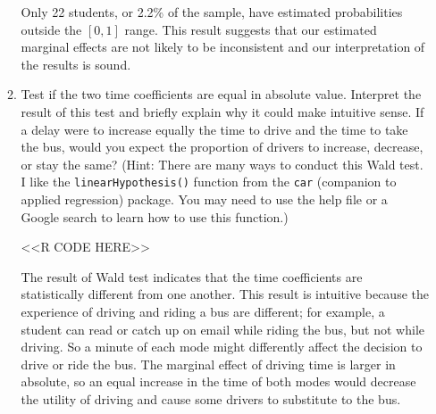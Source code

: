 \documentclass[11pt,letterpaper]{article}
\begin{document}
\begin{enumerate}[label=\alph*., leftmargin=*]
\begin{enumerate}[label=\roman*.]
		Only 22 students, or 2.2\% of the sample, have estimated probabilities outside the $[0, 1]$ range. This result suggests that our estimated marginal effects are not likely to be inconsistent and our interpretation of the results is sound.

		\item Test if the two time coefficients are equal in absolute value. Interpret the result of this test and briefly explain why it could make intuitive sense. If a delay were to increase equally the time to drive and the time to take the bus, would you expect the proportion of drivers to increase, decrease, or stay the same? (Hint: There are many ways to conduct this Wald test. I like the \texttt{linearHypothesis()} function from the \texttt{car} (companion to applied regression) package. You may need to use the help file or a Google search to learn how to use this function.) 

		<<R CODE HERE>>

		The result of Wald test indicates that the time coefficients are statistically different from one another. This result is intuitive because the experience of driving and riding a bus are different; for example, a student can read or catch up on email while riding the bus, but not while driving. So a minute of each mode might differently affect the decision to drive or ride the bus. The marginal effect of driving time is larger in absolute, so an equal increase in the time of both modes would decrease the utility of driving and cause some drivers to substitute to the bus.
	\end{enumerate}
\end{enumerate}
\end{document}
